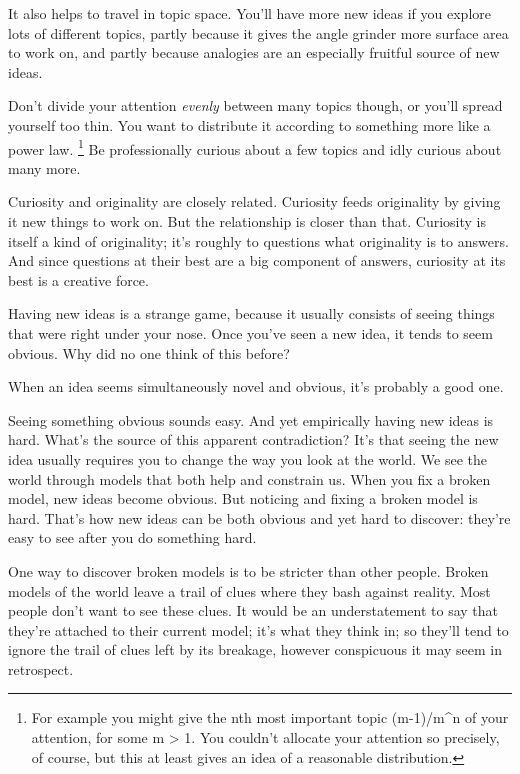 \documentclass[12pt]{book}
\begin{document}
It also helps to travel in topic space. You'll have more new ideas if
you explore lots of different topics, partly because it gives the angle
grinder more surface area to work on, and partly because analogies are
an especially fruitful source of new ideas.

Don't divide your attention \emph{evenly} between many topics though, or
you'll spread yourself too thin. You want to distribute it according to
something more like a power law. \footnote{For example you might give the nth most important topic
(m-1)/m\^{}n of your attention, for some m \textgreater{} 1. You
couldn't allocate your attention so precisely, of course, but this at
least gives an idea of a reasonable distribution.} Be
professionally curious about a few topics and idly curious about many
more.

Curiosity and originality are closely related. Curiosity feeds
originality by giving it new things to work on. But the relationship is
closer than that. Curiosity is itself a kind of originality; it's
roughly to questions what originality is to answers. And since questions
at their best are a big component of answers, curiosity at its best is a
creative force.

Having new ideas is a strange game, because it usually consists of
seeing things that were right under your nose. Once you've seen a new
idea, it tends to seem obvious. Why did no one think of this before?

When an idea seems simultaneously novel and obvious, it's probably a
good one.

Seeing something obvious sounds easy. And yet empirically having new
ideas is hard. What's the source of this apparent contradiction? It's
that seeing the new idea usually requires you to change the way you look
at the world. We see the world through models that both help and
constrain us. When you fix a broken model, new ideas become obvious. But
noticing and fixing a broken model is hard. That's how new ideas can be
both obvious and yet hard to discover: they're easy to see after you do
something hard.

One way to discover broken models is to be stricter than other people.
Broken models of the world leave a trail of clues where they bash
against reality. Most people don't want to see these clues. It would be
an understatement to say that they're attached to their current model;
it's what they think in; so they'll tend to ignore the trail of clues
left by its breakage, however conspicuous it may seem in retrospect.
\end{document}
